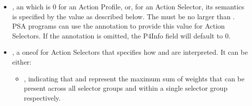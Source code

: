 \documentclass[11pt]{article}
\begin{document}
{\begin{itemize}
\item{}
, an  which is 0 for an Action Profile, or, for an
Action Selector, its semantics is specified by the 
value as described below.
The  must be no larger than . PSA programs can use the
 annotation to provide this value for Action Selectors.
If the annotation is omitted, the P4Info field will default to 0.%

\item{}
, a oneof for Action Selectors that
specifies how  and  are interpreted. It can be either:%

\begin{itemize}[noitemsep,topsep=\mdcompacttopsep]%

\item{}, indicating that  and  represent
the maximum sum of weights that can be present across all selector groups
and within a single selector group respectively.%


\end{itemize}
\end{itemize}}
\end{document}
